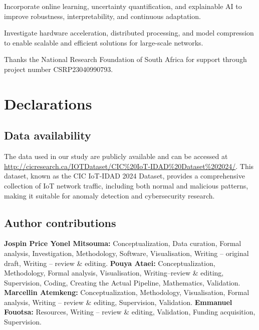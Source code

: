 \documentclass[pdflatex,sn-mathphys-num]{sn-jnl}
\theoremstyle{thmstyleone}
\theoremstyle{thmstyletwo}
\theoremstyle{thmstylethree}
\begin{document}
\noindent Incorporate online learning, uncertainty quantification, and explainable AI to improve robustness, interpretability, and continuous adaptation.
    
\noindent Investigate hardware acceleration, distributed processing, and model compression to enable scalable and efficient solutions for large-scale networks.

\backmatter

Thanks the National Research Foundation of South Africa for support through project number CSRP23040990793.

\section*{Declarations}

\subsection*{Data availability}
The data used in our study are publicly available and can be accessed at \url{http://cicresearch.ca/IOTDataset/CIC%20IoT-IDAD%20Dataset%202024/}. This dataset, known as the CIC IoT-IDAD 2024 Dataset, provides a comprehensive collection of IoT network traffic, including both normal and malicious patterns, making it suitable for anomaly detection and cybersecurity research.

\subsection*{Author contributions}
\textbf{Jospin Price Yonel Mitsouma:} Conceptualization, Data curation, Formal analysis, Investigation, Methodology, Software, Visualisation, Writing -- original draft, Writing -- review \& editing. \textbf{Pouya Ataei:} Conceptualization, Methodology, Formal analysis, Visualisation, Writing--review \& editing, Supervision, Coding, Creating the Actual Pipeline, Mathematics, Validation. \textbf{Marcellin Atemkeng:} Conceptualization, Methodology, Visualisation, Formal analysis, Writing -- review \& editing, Supervision, Validation. \textbf{Emmanuel Fouotsa:} Resources, Writing -- review \& editing, Validation, Funding acquisition, Supervision.


\end{document}
